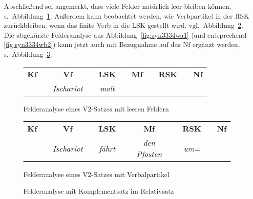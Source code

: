 Abschließend sei angemerkt, dass viele Felder natürlich leer bleiben können, s.\ Abbildung~\ref{fig:leerefelder}.
Außerdem kann beobachtet werden, wie Verbpartikel in der RSK zurückbleiben, wenn das finite Verb in die LSK gestellt wird, vgl.\ Abbildung~\ref{fig:verbalpartikelalleinzuhaus}.
Die abgekürzte Felderanalyse aus Abbildung~\ref{fig:syn3334wa1} (und entsprechend \ref{fig:syn3334wb2}) kann jetzt auch mit Bezugnahme auf das Nf ergänzt werden, s.\ Abbildung~\ref{fig:syn3334wa1w}.

\begin{figure}
  \centering
  \begin{tabular}{cp{0.1em}cp{0.1em}cp{0.1em}cp{0.1em}cp{0.1em}c}
    \textbf{Kf} && \textbf{Vf} && \textbf{LSK} && \textbf{Mf} && \textbf{RSK} && \textbf{Nf} \\
    \cmidrule{1-1}\cmidrule{3-3}\cmidrule{5-5}\cmidrule{7-7}\cmidrule{9-9}
    && \textit{Ischariot} && \textit{malt} &&&&&& \\
  \end{tabular}
  \caption{Felderanalyse eines V2-Satzes mit leeren Feldern}
  \label{fig:leerefelder}
\end{figure}

\begin{figure}
  \centering
  \begin{tabular}{cp{0.1em}cp{0.1em}cp{0.1em}cp{0.1em}cp{0.1em}c}
    \textbf{Kf} && \textbf{Vf} && \textbf{LSK} && \textbf{Mf} && \textbf{RSK} && \textbf{Nf} \\
    \cmidrule{1-1}\cmidrule{3-3}\cmidrule{5-5}\cmidrule{7-7}\cmidrule{9-9}\cmidrule{11-11}
    && \textit{Ischariot} && \textit{fährt} && \textit{den Pfosten} && \textit{um=} & \\
  \end{tabular}
  \caption{Felderanalyse eines V2-Satzes mit Verbalpartikel}
  \label{fig:verbalpartikelalleinzuhaus}
\end{figure}

\begin{figure}
  \centering
  \caption{Felderanalyse mit Komplementsatz im Relativsatz}
  \label{fig:syn3334wa1w}
\end{figure}

